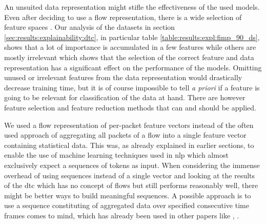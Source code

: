 An unsuited data representation might stifle the effectiveness of the used models. Even after deciding to use a flow representation, there is a wide selection of feature spaces \cite{feature_vectors}.
Our analysis of the datasets in section \ref{sec:results:explainability:dtc}, in particular table \ref{table:results:expl:fimp_90_ds}, shows that a lot of importance is accumulated in a few features while others are mostly irrelevant which shows that the selection of the correct feature and data representation has a significant effect on the performance of the models. Omitting unused or irrelevant features from the data representation would drastically decrease training time, but it is of course impossible to tell \textit{a priori} if a feature is going to be relevant for classification of the data at hand. There are however feature selection and feature reduction methods that can and should be applied. \par
We used a flow representation of per-packet feature vectors instead of the often used approach of aggregating all packets of a flow into a single feature vector containing statistical data. This was, as already explained in earlier sections, to enable the use of machine learning techniques used in \gls{nlp} which almost exclusively expect a sequences of tokens as input. When considering the immense overhead of using sequences instead of a single vector and looking at the results of the \gls{dtc} which has no concept of flows but still performs reasonably well, there might be better ways to build meaningful sequences. A possible approach is to use a sequence constituting of aggregated data over specified consecutive time frames comes to mind, which has already been used in other papers like \cite{attention_model_ids}, \cite{kitsune}. \par


